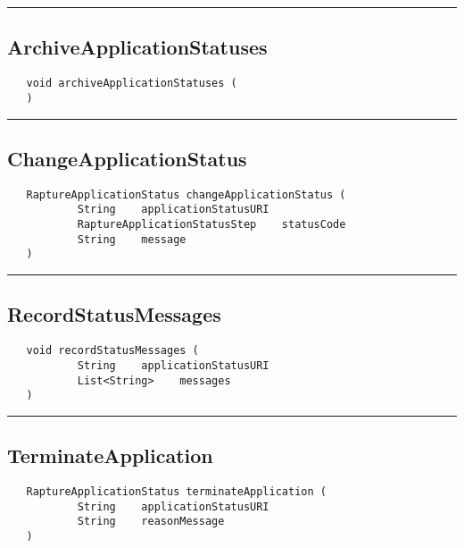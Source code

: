 \rule{15cm}{2pt}
\subsection{ArchiveApplicationStatuses}
\label{Api:ArchiveApplicationStatuses}
\begin{verbatim}
   void archiveApplicationStatuses (
   )
\end{verbatim}



\rule{15cm}{2pt}
\subsection{ChangeApplicationStatus}
\label{Api:ChangeApplicationStatus}
\begin{verbatim}
   RaptureApplicationStatus changeApplicationStatus (
           String    applicationStatusURI
           RaptureApplicationStatusStep    statusCode
           String    message
   )
\end{verbatim}



\rule{15cm}{2pt}
\subsection{RecordStatusMessages}
\label{Api:RecordStatusMessages}
\begin{verbatim}
   void recordStatusMessages (
           String    applicationStatusURI
           List<String>    messages
   )
\end{verbatim}



\rule{15cm}{2pt}
\subsection{TerminateApplication}
\label{Api:TerminateApplication}
\begin{verbatim}
   RaptureApplicationStatus terminateApplication (
           String    applicationStatusURI
           String    reasonMessage
   )
\end{verbatim}



